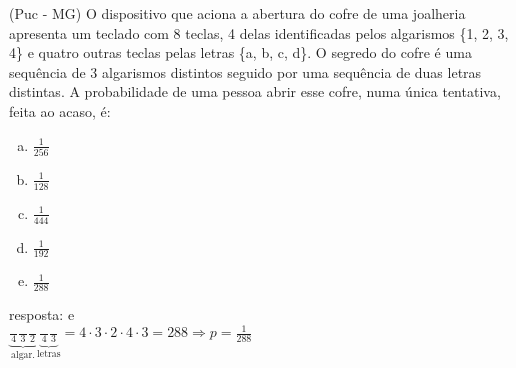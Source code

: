 \begin{ex}
 (Puc - MG) O dispositivo que aciona a abertura do cofre de uma joalheria apresenta um teclado com 8 teclas, 4 delas identificadas pelos algarismos \{1, 2, 3,  4\} e quatro outras teclas pelas letras \{a, b, c, d\}. O segredo do cofre é uma sequência de 3 algarismos distintos seguido por uma sequência de duas letras distintas. A probabilidade de uma pessoa abrir esse cofre, numa única tentativa, feita ao acaso, é:
    \begin{enumerate}[(a)]
    \item $\frac{1}{256}$
    \item $\frac{1}{128}$
    \item $\frac{1}{444}$
    \item $\frac{1}{192}$
    \item$\frac{1}{288}$
    \end{enumerate}
      \begin{sol}
        resposta: e \\
       $ \underbrace{
        \frac{\phantom{A}}{4}\frac{\phantom{A}}{3}\frac{\phantom{A}}{2}}_\text{algar.}\underbrace{
        \frac{\phantom{A}}{4}\frac{\phantom{A}}{3}}_\text{letras}= 4\cdot3\cdot2\cdot4\cdot3=288\Longrightarrow p=\frac{1}{288}$
      \end{sol}
\end{ex}